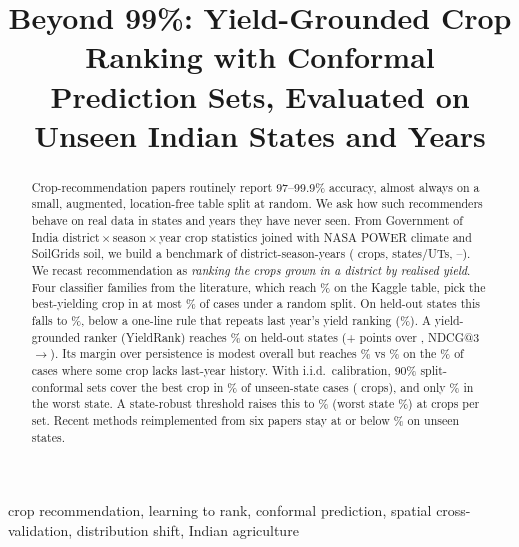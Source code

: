 \documentclass[conference]{IEEEtran}
\begin{document}
\title{Beyond 99\%: Yield-Grounded Crop Ranking with Conformal Prediction Sets, Evaluated on Unseen Indian States and Years}

\author{
}

\maketitle

\begin{abstract}
Crop-recommendation papers routinely report 97--99.9\% accuracy, almost always on a small,
augmented, location-free table split at random. We ask how such recommenders behave on real data
in states and years they have never seen. From Government of India
district\,$\times$\,season\,$\times$\,year crop statistics joined with NASA POWER climate and
SoilGrids soil, we build a benchmark of \NQueries{} district-season-years (\NCrops{} crops,
\NStates{} states/UTs, \YearA--\YearB). We recast recommendation as \emph{ranking the crops grown in
a district by realised yield}. Four classifier families from the literature, which reach
\KaggleRF\% on the Kaggle table, pick the best-yielding crop in at most \BaseHitR\% of cases under
a random split. On held-out states this falls to \BaseHitLSO\%, below a one-line rule that repeats
last year's yield ranking (\PersHitLSO\%). A yield-grounded ranker (YieldRank) reaches
\OursHitLSO\% on held-out states (+\GainHitLSO{} points over \BaseNameLSO, NDCG@3
\BaseNDCGLSO$\to$\OursNDCGLSO). Its margin over persistence is modest overall but reaches
\OursHitColdLSO\% vs \PersHitColdLSO\% on the \ColdShareLSO\% of cases where some crop lacks
last-year history. With i.i.d.\ calibration, 90\% split-conformal sets cover the best crop in
\CovIIDLSO\% of unseen-state cases (\SizeIIDLSO{} crops), and only \WorstIID\% in the worst
state. A state-robust threshold raises this to \CCSRCovLSO\% (worst state \SRWorstCov\%) at
\CCSRSizeLSO{} crops per set. Recent methods reimplemented from six papers stay at or below
\MCBestPaperHit\% on unseen states.
\end{abstract}

\begin{IEEEkeywords}
crop recommendation, learning to rank, conformal prediction, spatial cross-validation, distribution shift, Indian agriculture
\end{IEEEkeywords}
\end{document}
